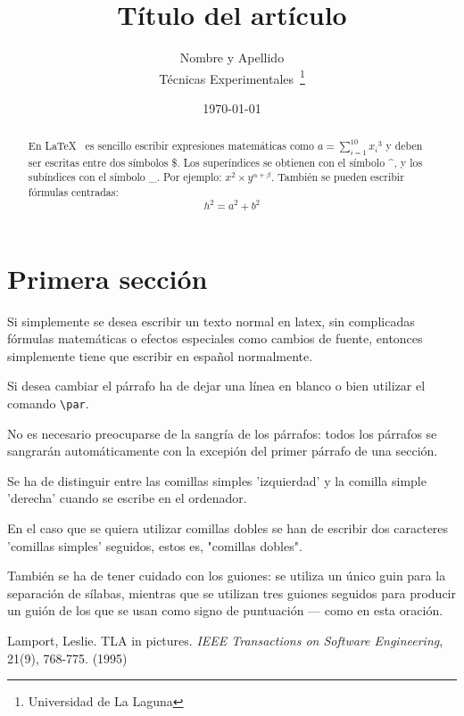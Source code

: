 \documentclass[a4paper,12pt]{article}
\begin{document}
\title{Título del artículo}
  \author{Nombre y Apellido \\
          Técnicas Experimentales~\footnote{Universidad de La Laguna}
         }
  \date{\today}
  \maketitle
   \begin{abstract}
     En \LaTeX{}~\cite{Lam:86} es sencillo escribir expresiones
     matemáticas como $a=\sum_{i=1}^{10} {x_i}^{3}$
     y deben ser escritas entre dos símbolos \$.
     Los superíndices se obtienen con el símbolo \^{}, y
     los subíndices con el símbolo \_.
     Por ejemplo: $x^2 \times y^{\alpha + \beta}$.
     También se pueden escribir f\'ormulas centradas:
   \[h^2=a^2 + b^2 \]
\end{abstract}
 \section{Primera sección}
Si simplemente se desea escribir un texto normal en latex,
sin complicadas f\'ormulas matem\'aticas o efectos especiales
como cambios  de fuente, entonces simplemente tiene que escribir
en espa\~nol normalmente.
\par
Si desea cambiar el p\'arrafo ha de dejar una l\'inea en blanco o bien
utilizar el comando \verb|\par|.

No es necesario preocuparse de la sangr\'ia de los p\'arrafos:
todos los p\'arrafos se sangrar\'an autom\'aticamente con la excepi\'on
del primer p\'arrafo de una secci\'on.

Se ha de distinguir entre las comillas simples 'izquierdad' 
y la comilla simple 'derecha' cuando se escribe en el ordenador.

En el caso que se quiera utilizar comillas dobles se han de
escribir dos caracteres 'comillas simples' seguidos, estos es,
"comillas dobles".

Tambi\'en se ha de tener cuidado con los guiones: se utiliza un \'unico
guin para la separaci\'on de s\'ilabas, mientras que se utilizan 
tres  guiones seguidos para producir un gui\'on de los que se usan
como signo de puntuaci\'on --- como en esta oraci\'on.
\begin{thebibliography}{00}
      Lamport, Leslie.
      TLA in pictures.
      \emph{IEEE Transactions on Software Engineering},
      21(9), 768-775.
      (1995)
\end{thebibliography}
\end{document}

